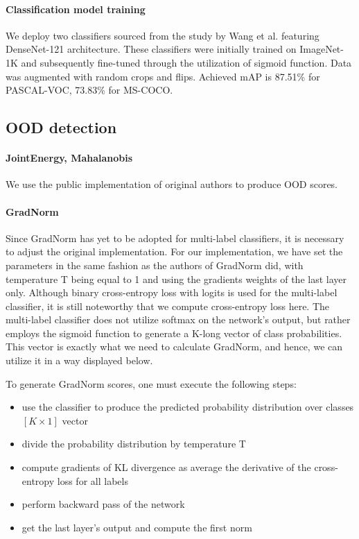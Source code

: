 \paragraph{Classification model training}
We deploy two classifiers sourced from the study by Wang et al.\cite{Wang2021} featuring DenseNet-121 architecture. 
These classifiers were initially trained on ImageNet-1K and subsequently fine-tuned through the utilization of sigmoid function.
Data was augmented with random crops and flips. 
Achieved mAP is 87.51\% for PASCAL-VOC, 73.83\% for MS-COCO. 

\subsection{OOD detection}
\paragraph{JointEnergy, Mahalanobis}
We use the public implementation of original authors to produce OOD scores. 

\paragraph{GradNorm}
Since GradNorm has yet to be adopted for multi-label classifiers, it is necessary to adjust the original implementation. 
For our implementation, we have set the parameters in the same fashion as the authors of GradNorm did, with temperature T being equal to 1 and using the gradients weights of the last layer only. 
Although binary cross-entropy loss with logits is used for the multi-label classifier, it is still noteworthy that we compute cross-entropy loss here. 
The multi-label classifier does not utilize softmax on the network's output, but rather employs the sigmoid function to generate a K-long vector of class probabilities. 
This vector is exactly what we need to calculate GradNorm, and hence, we can utilize it in a way displayed below.

\noindent To generate GradNorm scores, one must execute the following steps:
\begin{itemize}
    \itemsep0em 
    \item use the classifier to produce the predicted probability distribution over classes $[K \times 1]$ vector
    \item divide the probability distribution by temperature T
    \item compute gradients of KL divergence as average the derivative of the cross-entropy loss for all labels
    \item perform backward pass of the network
    \item get the last layer's output and compute the first norm
\end{itemize}

